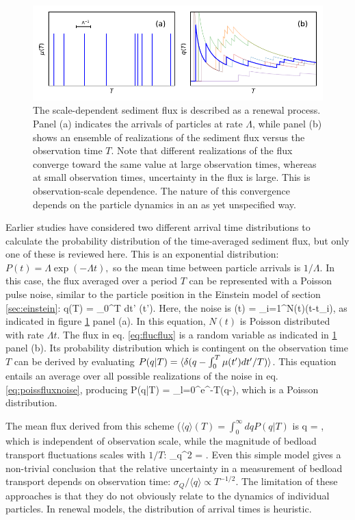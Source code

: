  \begin{figure}[!htbp]
	\includegraphics[width=\linewidth,keepaspectratio]{./figures/ch1/anceyRenewal.pdf}
	\caption{The scale-dependent sediment flux is described as a renewal process. Panel (a) indicates the arrivals of particles at rate $\Lambda$, while panel (b) shows an ensemble of realizations of the sediment flux versus the observation time $T$. Note that different realizations of the flux converge toward the same value at large observation times, whereas at small observation times, uncertainty in the flux is large. This is observation-scale dependence. The nature of this convergence depends on the particle dynamics in an as yet unspecified way. }
	\label{fig:ancey}
\end{figure}
Earlier studies have considered two different arrival time distributions to calculate the probability distribution of the time-averaged sediment flux, but only one of these is reviewed here.
This is an exponential distribution: $P(t) = \Lambda \exp(-\Lambda t),$ so the mean time between particle arrivals is $1/\Lambda$.
In this case, the flux averaged over a period $T$ can be represented with a Poisson pulse noise, similar to the particle position in the Einstein model of section \ref{sec:einstein}:
\be q(T) = \int_0^T dt' \mu(t'). \label{eq:flucflux}\ee
Here, the noise is 
\be \mu(t) = \sum_{i=1}^{N(t)}\delta(t-t_i), \label{eq:poissfluxnoise}\ee
as indicated in figure \ref{fig:ancey} panel (a). In this equation, $N(t)$ is Poisson distributed with rate $\Lambda t$. 
The flux in eq. \ref{eq:flucflux} is a random variable as indicated in \ref{fig:ancey} panel (b). Its probability distribution which is contingent on the observation time $T$ can be derived by evaluating $P(q|T) = \langle \delta(q-\int_0^T \mu(t') dt'/T) \rangle$. This equation entails an average over all possible realizations of the noise in eq. \ref{eq:poissfluxnoise}, producing \citep{VanKampen2007}
\be P(q|T) = \sum_{l=0}^\infty {}e^{-\Lambda T}\delta(q-),\ee
which is a Poisson distribution.

The mean flux derived from this scheme ($\langle q \rangle(T) = \int_0^\infty dq P(q|T)$ is
\be \langle q \rangle = \Lambda, \ee
which is independent of observation scale, while the magnitude of bedload transport fluctuations scales with $1/T$: 
\be \sigma_q^2 = .\ee
Even this simple model gives a non-trivial conclusion that the relative uncertainty in a measurement of bedload transport depends on observation time: $\sigma_Q/\langle q \rangle \propto T^{-1/2}.$
The limitation of these approaches is that they do not obviously relate to the dynamics of individual particles. In renewal models, the distribution of arrival times is heuristic.

